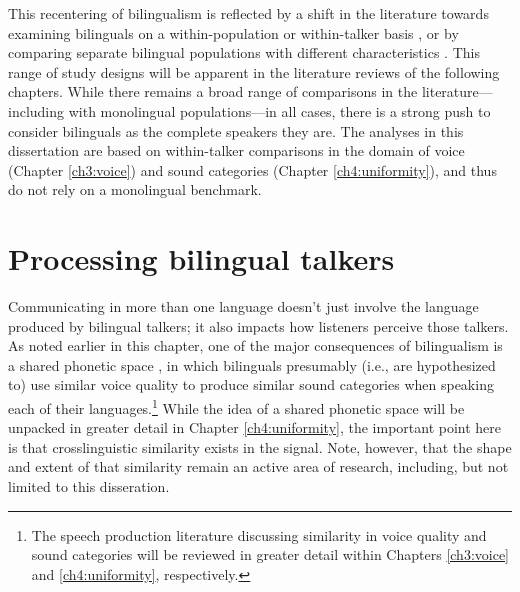 This recentering of bilingualism is reflected by a shift in the literature towards examining bilinguals on a within-population \citep[e.g.,][]{chan_2020_lexically} or within-talker basis \citep[e.g.,][]{simonet_2019_convergence}, or by comparing separate bilingual populations with different characteristics \citep[e.g.,][]{brown_2009_phonological}. This range of study designs will be apparent in the literature reviews of the following chapters. While there remains a broad range of comparisons in the literature---including with monolingual populations---in all cases, there is a strong push to consider bilinguals as the complete speakers they are. The analyses in this dissertation are based on within-talker comparisons in the domain of voice (Chapter \ref{ch3:voice}) and sound categories (Chapter \ref{ch4:uniformity}), and thus do not rely on a monolingual benchmark.

\section{Processing bilingual talkers}\label{ch1:sec:processing}

Communicating in more than one language doesn't just involve the language produced by bilingual talkers; it also impacts how listeners perceive those talkers. As noted earlier in this chapter, one of the major consequences of bilingualism is a shared phonetic space \citep{flege_2021_slmr}, in which bilinguals presumably (i.e., are hypothesized to) use similar voice quality to produce similar sound categories when speaking each of their languages.\footnote{The speech production literature discussing similarity in voice quality and sound categories will be reviewed in greater detail within Chapters \ref{ch3:voice} and \ref{ch4:uniformity}, respectively.} While the idea of a shared phonetic space will be unpacked in greater detail in Chapter \ref{ch4:uniformity}, the important point here is that crosslinguistic similarity exists in the signal. Note, however, that the shape and extent of that similarity remain an active area of research, including, but not limited to this disseration.

